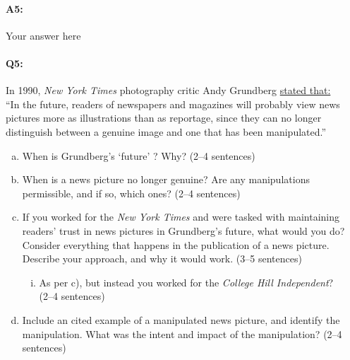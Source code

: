 \paragraph{A5:} Your answer here



\pagebreak
\paragraph{Q5:} 
In 1990, \emph{New York Times} photography critic Andy Grundberg \href{https://www.nytimes.com/1990/08/12/arts/photography-view-ask-it-no-questions-the-camera-can-lie.html}{stated that:}\\``In the future, readers of newspapers and
magazines will probably view news pictures more as
illustrations than as reportage, since they can no longer distinguish between a genuine image and one that has been manipulated.''

\begin{enumerate}[(a)]
    \item When is Grundberg's `future' ? Why? (2--4 sentences)
    
    \item When is a news picture no longer genuine? Are any manipulations permissible, and if so, which ones? (2--4 sentences)
    
    \item If you worked for the \emph{New York Times} and were tasked with maintaining readers' trust in news pictures in Grundberg's future, what would you do? Consider everything that happens in the publication of a news picture. Describe your approach, and why it would work. (3--5 sentences)
    
    \begin{enumerate}[(i)]
    \item As per c), but instead you worked for the \emph{College Hill Independent}? \\(2--4 sentences)
    \end{enumerate}
    
    \item Include an cited example of a manipulated news picture, and identify the manipulation. What was the intent and impact of the manipulation? (2--4 sentences)
\end{enumerate}

